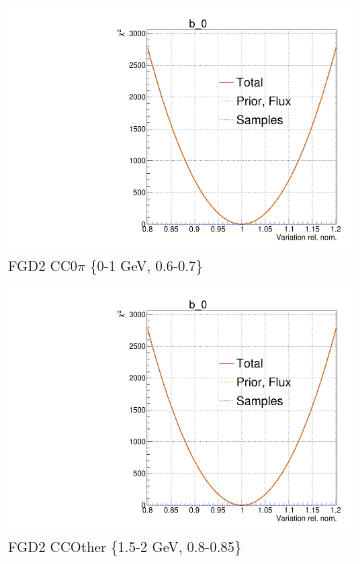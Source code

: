 \begin{figure}[!h]
\begin{subfigure}[t]{0.32\textwidth}
	\includegraphics[width=\textwidth, trim={0mm 0mm 0mm 11mm}, clip,page=410]{figures/mach3/Asimov/Full_LLHscan_18July_BeRPA_U_ND280logL_scan}
	\caption{FGD2 CC0$\pi$ 	\{0-1 GeV, 0.6-0.7\}}
\end{subfigure}
\begin{subfigure}[t]{0.32\textwidth}
	\includegraphics[width=\textwidth, trim={0mm 0mm 0mm 11mm}, clip,page=517]{figures/mach3/Asimov/Full_LLHscan_18July_BeRPA_U_ND280logL_scan}
	\caption{FGD2 CCOther \{1.5-2 GeV, 0.8-0.85\}}
\end{subfigure}
\begin{subfigure}[t]{0.32\textwidth}

\end{subfigure}
\end{figure}
